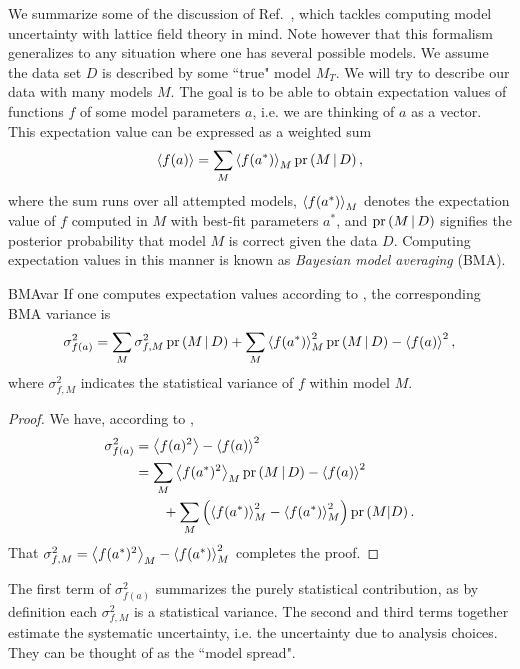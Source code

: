 We summarize some of the discussion of Ref.~\cite{neil_improved_2024},
which tackles computing
model uncertainty with lattice field theory in mind. Note however that this
formalism generalizes to any situation where one has several possible models. 
We assume the data set $D$ is described by some ``true" model $M_T$.
We will try to describe our data with many models $M$.
The goal is to be able to obtain expectation values of functions $f$
of some model parameters $a$, i.e. we are thinking of $a$ as a vector.
This expectation value can be expressed as a weighted sum 
\begin{equation}\label{eq:BMAmean}
\ev{f(a)}=
\sum_M \ev{f(a^*)}_M \pr{M\given D},
\end{equation} 
where the sum runs over all attempted models, 
$\ev{f(a^*)}_M$ denotes the expectation value of $f$ computed in $M$ with best-fit
parameters $a^*$, and $\pr{M\given D}$ signifies the posterior probability that model $M$ 
is correct given the data $D$. Computing expectation values in this manner
is known as {\it Bayesian model averaging} (BMA).


\begin{theorem}{}{BMAvar}
If one computes expectation values according to ,
the corresponding BMA variance is
$$
\sigma^2_{f(a)}=
\sum_M\sigma^2_{f,M}\pr{M\given D}
+\sum_M\ev{f(a^*)}_M^2\pr{M\given D}
-\ev{f(a)}^2,
$$
where $\sigma^2_{f,M}$ indicates the statistical variance of $f$
within model $M$.
\begin{proof}
We have, according to ,
\begin{equation}\begin{aligned}
\sigma^2_{f(a)} &= \ev{f(a)^2}-\ev{f(a)}^2\\
&= \sum_M\ev{f(a^*)^2}_M\pr{M\given D}
-\ev{f(a)}^2\\
&~~~~~~+\sum_M\left(\ev{f(a^*)}_M^2-\ev{f(a^*)}_M^2
\right)\pr{M|D}.
\end{aligned}\end{equation}
That 
$\sigma^2_{f,M}=\ev{f(a^*)^2}_M-\ev{f(a^*)}_M^2$
completes the proof.
\end{proof}
\end{theorem}

The first term of $\sigma^2_{f(a)}$ summarizes the purely statistical
contribution, as by definition each $\sigma^2_{f,M}$ is a statistical variance.
The second and third terms together estimate the systematic uncertainty, i.e.
the uncertainty due to analysis choices. 
They can be thought of as the ``model spread".



